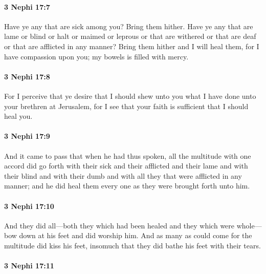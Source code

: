 		\paragraph{3 Nephi 17:7} %
			\label{3NEPHI-17-7}

			Have ye any that are sick among you?
			Bring them hither.
			Have ye any that are lame or blind or halt or maimed or leprous
			or that are withered or that are deaf or that are afflicted in any manner?
			Bring them hither and I will heal them,
			for I have compassion upon you;
			my bowels is filled with mercy.

		\paragraph{3 Nephi 17:8} %
			\label{3NEPHI-17-8}

			For I perceive that ye desire
			that I should shew unto you what I have done unto your brethren at Jerusalem,
			for I see that your faith is sufficient that I should heal you.

		\paragraph{3 Nephi 17:9} %
			\label{3NEPHI-17-9}

			And it came to pass that when he had thus spoken,
			all the multitude with one accord did go forth
			with their sick and their afflicted and their lame
			and with their blind and with their dumb
			and with all they that were afflicted in any manner;
			and he did heal them every one as they were brought forth unto him.

		\paragraph{3 Nephi 17:10} %
			\label{3NEPHI-17-10}

			And they did all---both they which had been healed and they which were whole---
			bow down at his feet and did worship him.
			And as many as could come for the multitude did kiss his feet,
			insomuch that they did bathe his feet with their tears.

		\paragraph{3 Nephi 17:11} %
			\label{3NEPHI-17-11}

